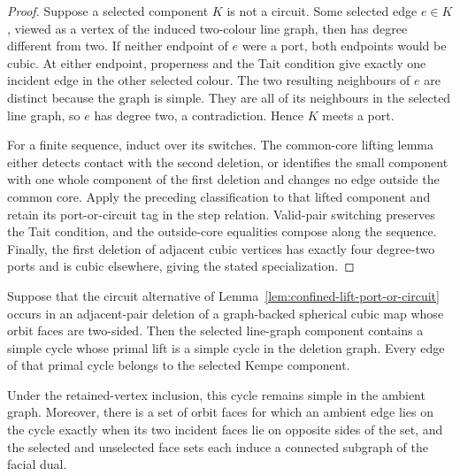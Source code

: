 \begin{proof}
Suppose a selected component $K$ is not a circuit.  Some selected edge
$e\in K$, viewed as a vertex of the induced two-colour line graph, then
has degree different from two.  If neither endpoint of $e$ were a port,
both endpoints would be cubic.  At either endpoint, properness and the Tait
condition give exactly one incident edge in the other selected colour.
The two resulting neighbours of $e$ are distinct because the graph is
simple.  They are all of its neighbours in the selected line graph, so
$e$ has degree two, a contradiction.  Hence $K$ meets a port.

For a finite sequence, induct over its switches.  The common-core lifting
lemma either detects contact with the second deletion, or identifies the
small component with one whole component of the first deletion and changes
no edge outside the common core.  Apply the preceding classification to
that lifted component and retain its port-or-circuit tag in the step
relation.  Valid-pair switching preserves the Tait condition, and the
outside-core equalities compose along the sequence.  Finally, the first
deletion of adjacent cubic vertices has exactly four degree-two ports and
is cubic elsewhere, giving the stated specialization.
\end{proof}

\begin{lemma}
\label{lem:confined-lift-circuit-facial-bond}
Suppose that the circuit alternative of
Lemma~\ref{lem:confined-lift-port-or-circuit} occurs in an adjacent-pair
deletion of a graph-backed spherical cubic map whose orbit faces are
two-sided.  Then the selected line-graph component contains a simple cycle
whose primal lift is a simple cycle in the deletion graph.  Every edge of
that primal cycle belongs to the selected Kempe component.

Under the retained-vertex inclusion, this cycle remains simple in the
ambient graph.  Moreover, there is a set of orbit faces for which an ambient
edge lies on the cycle exactly when its two incident faces lie on opposite
sides of the set, and the selected and unselected face sets each induce a
connected subgraph of the facial dual.
\end{lemma}

